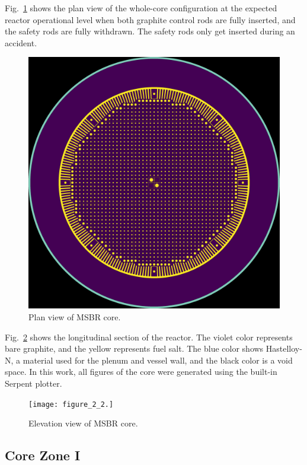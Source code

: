 \documentclass{anstrans}
\begin{document}
Fig.~\ref{fig:plan} shows the plan view of the whole-core configuration at the 
expected reactor operational level when both graphite control rods are fully 
inserted, and the safety rods are fully withdrawn. The safety rods only get 
inserted during an accident. 
\begin{figure}[htbp!] %
  \centering
  \vspace{-0.3em}
  \includegraphics[width=0.95\linewidth]{figure_2_1.png}
  \caption{Plan view of \gls{MSBR} core.}
  \vspace{-0.6em}
  \label{fig:plan}
\end{figure}
\FloatBarrier
Fig.~\ref{fig:elevation} shows the longitudinal section of the reactor. The 
violet color represents bare graphite, and the yellow represents fuel salt. The 
blue color shows Hastelloy-N, a material used for the plenum and vessel wall, 
and the black color is a void space. In this work, all figures of the core were 
generated using the built-in Serpent plotter.

\begin{figure}[htbp!] %
  \centering
  \texttt{[image: figure\_2\_2.]}
  \caption{Elevation view of \gls{MSBR} core.}
  \label{fig:elevation}
\end{figure}


\subsection{Core Zone I}
\end{document}
